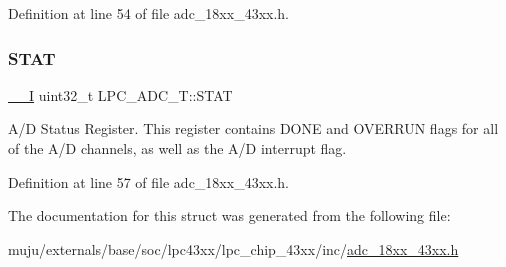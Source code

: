 Definition at line 54 of file adc\+\_\+18xx\+\_\+43xx.\+h.

\mbox{\label{struct_l_p_c___a_d_c___t_a6fd64c9a5717b2adc106721eb9ab190b}} 
\subsubsection{\texorpdfstring{S\+T\+AT}{STAT}}
{\footnotesize\ttfamily \hyperlink{core__sc300_8h_af63697ed9952cc71e1225efe205f6cd3}{\+\_\+\+\_\+I} uint32\+\_\+t L\+P\+C\+\_\+\+A\+D\+C\+\_\+\+T\+::\+S\+T\+AT}

A/D Status Register. This register contains D\+O\+NE and O\+V\+E\+R\+R\+UN flags for all of the A/D channels, as well as the A/D interrupt flag. 

Definition at line 57 of file adc\+\_\+18xx\+\_\+43xx.\+h.



The documentation for this struct was generated from the following file\+:\begin{DoxyCompactItemize}
\item 
muju/externals/base/soc/lpc43xx/lpc\+\_\+chip\+\_\+43xx/inc/\hyperlink{adc__18xx__43xx_8h}{adc\+\_\+18xx\+\_\+43xx.\+h}\end{DoxyCompactItemize}
